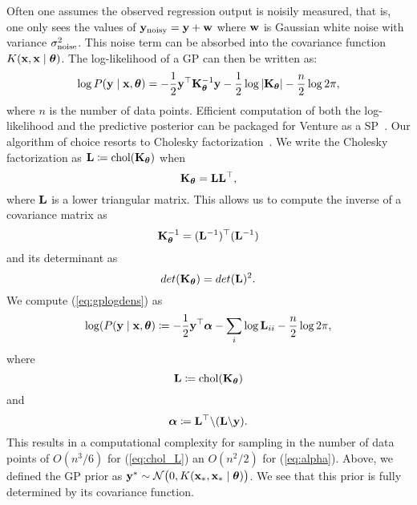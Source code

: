 Often one assumes the observed regression output is noisily measured, that is,
one only sees the values of $\mathbf{y}_{\textrm{noisy}} = \mathbf{y} + \mathbf{w}$ where $\mathbf{w}$ is
Gaussian white noise with variance $\sigma_{\textrm{noise}}^2$. This noise term can be
absorbed into the covariance function $K(\mathbf{x},\mathbf{x} \mid \bm{\theta})$.
The log-likelihood of a \ac{GP} can then be written as:
\begin{equation}
\label{eq:gplogdens}
\log P(\mathbf{y} \mid \mathbf{x},\bm{\theta}) =
-\frac12 \mathbf{y}^\top
\mathbf{K}_{\bm{\theta}}^{-1} \mathbf{y}
- \frac12\log \left\lvert \mathbf{K}_{\bm{\theta}} \right\rvert
- \frac{n}{2}\log 2\pi,
\end{equation}
where $n$ is the number of data points.
Efficient computation of both the log-likelihood and the predictive posterior
can be packaged for Venture as a \ac{SP}~\citep{mansinghka2014venture}.
Our algorithm of choice resorts to Cholesky factorization~\citep[chap. 2]{rasmussen2006gaussian}.
We write the Cholesky factorization as
$\mathbf{L}\coloneqq \text{chol}(\mathbf{K}_{\bm{\theta}})$ when
\begin{equation}
\mathbf{K}_{\bm{\theta}} = \mathbf{L}\mathbf{L}^\top,
\end{equation}
where $\mathbf{L}$ is a lower triangular matrix. This allows us to compute the inverse of a covariance matrix as
\begin{equation}
\mathbf{K}_{\bm{\theta}}^{-1} = (\mathbf{L}^{-1})^\top (\mathbf{L}^{-1})
\end{equation}
and its determinant as
\begin{equation}
det(\mathbf{K}_{\bm{\theta}}) = det(\mathbf{L})^2.
\end{equation}
We compute (\ref{eq:gplogdens}) as
\begin{equation}
\log(P(\mathbf{y} \mid \mathbf{x}, \bm{\theta})\coloneqq - \frac{1}{2} \mathbf{y}^\top \bm{\alpha} - \sum_i \log \mathbf{L}_{ii} - \frac{n}{2} \log 2 \pi,
\end{equation}
where 
\begin{equation}
\label{eq:chol_L}
\mathbf{L} \coloneqq \text{chol}(\mathbf{K}_{\bm{\theta}})
\end{equation}
and 
\begin{equation}
\label{eq:alpha}
\bm{\alpha} \coloneqq  \mathbf{L}^\top \backslash(\mathbf{L} \backslash \mathbf{y}). 
\end{equation}
This results in a computational complexity for sampling in the number of data points of $O(n^3/6)$ for (\ref{eq:chol_L}) an $O(n^2/2)$ for (\ref{eq:alpha}). 
Above, we defined the \ac{GP} prior as $\mathbf{y}^* \sim
\mathcal{N}\big(0,K(\mathbf{x}_*,\mathbf{x}_* \mid \bm{\theta} )\big)$.
We see that this prior is fully determined by its covariance function.
